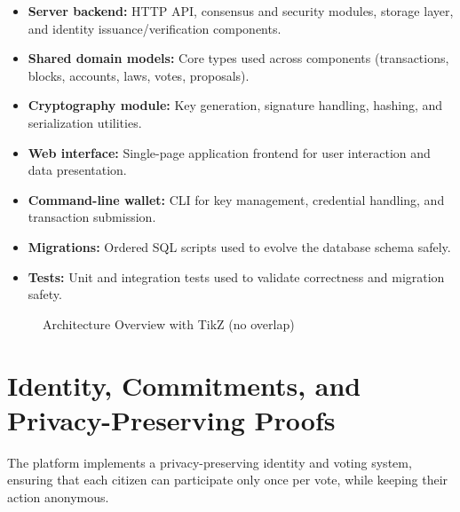 \documentclass[12pt,a4paper]{report}
\begin{document}
\bigskip
\begin{itemize}[noitemsep]
  \item \textbf{Server backend:} HTTP API, consensus and security modules, storage layer, and identity issuance/verification components.
  \item \textbf{Shared domain models:} Core types used across components (transactions, blocks, accounts, laws, votes, proposals).
  \item \textbf{Cryptography module:} Key generation, signature handling, hashing, and serialization utilities.
  \item \textbf{Web interface:} Single-page application frontend for user interaction and data presentation.
  \item \textbf{Command-line wallet:} CLI for key management, credential handling, and transaction submission.
  \item \textbf{Migrations:} Ordered SQL scripts used to evolve the database schema safely.
  \item \textbf{Tests:} Unit and integration tests used to validate correctness and migration safety.
\end{itemize}

\begin{figure}[h!]
  \centering
  \caption{Architecture Overview with TikZ (no overlap)}
  \label{fig:tikz-architecture}
\end{figure}

\section{Identity, Commitments, and Privacy-Preserving Proofs}
The platform implements a privacy-preserving identity and voting system, ensuring that each citizen can participate only once per vote, while keeping their action anonymous.
\end{document}
